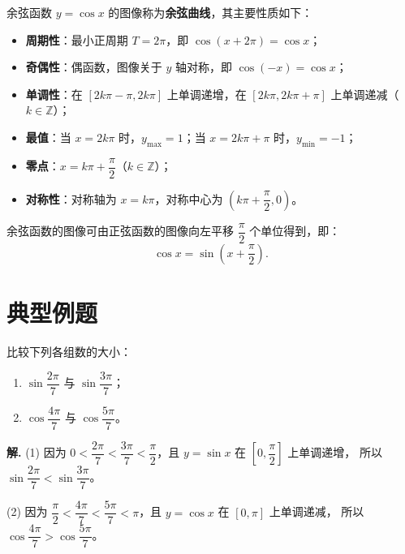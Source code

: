 \documentclass[11pt]{ctexrep}
\begin{document}
\begin{property}[余弦函数的图像与性质]
    余弦函数 $y = \cos x$ 的图像称为\textbf{余弦曲线}，其主要性质如下：
    \begin{itemize}
        \item \textbf{周期性}：最小正周期 $T = 2\pi$，即 $\cos(x + 2\pi) = \cos x$；
        \item \textbf{奇偶性}：偶函数，图像关于 $y$ 轴对称，即 $\cos(-x) = \cos x$；
        \item \textbf{单调性}：在 $[2k\pi - \pi, 2k\pi]$ 上单调递增，在 $[2k\pi, 2k\pi + \pi]$ 上单调递减（$k \in \mathbb{Z}$）；
        \item \textbf{最值}：当 $x = 2k\pi$ 时，$y_{\max} = 1$；当 $x = 2k\pi + \pi$ 时，$y_{\min} = -1$；
        \item \textbf{零点}：$x = k\pi + \dfrac{\pi}{2}$（$k \in \mathbb{Z}$）；
        \item \textbf{对称性}：对称轴为 $x = k\pi$，对称中心为 $\left(k\pi + \dfrac{\pi}{2}, 0\right)$。
    \end{itemize}
\end{property}

\begin{property}[正弦曲线与余弦曲线的关系]
    余弦函数的图像可由正弦函数的图像向左平移 $\dfrac{\pi}{2}$ 个单位得到，即：
    \[
        \cos x = \sin\left(x + \frac{\pi}{2}\right).
    \]
\end{property}

\section*{典型例题}

\begin{example}[利用单调性比较大小]
    比较下列各组数的大小：
    \begin{enumerate}
        \item $\sin\dfrac{2\pi}{7}$ 与 $\sin\dfrac{3\pi}{7}$；
        \item $\cos\dfrac{4\pi}{7}$ 与 $\cos\dfrac{5\pi}{7}$。
    \end{enumerate}
\end{example}

\textbf{解.} (1) 因为 $0 < \dfrac{2\pi}{7} < \dfrac{3\pi}{7} < \dfrac{\pi}{2}$，且 $y = \sin x$ 在 $\left[0, \dfrac{\pi}{2}\right]$ 上单调递增，
所以 $\sin\dfrac{2\pi}{7} < \sin\dfrac{3\pi}{7}$。

(2) 因为 $\dfrac{\pi}{2} < \dfrac{4\pi}{7} < \dfrac{5\pi}{7} < \pi$，且 $y = \cos x$ 在 $[0, \pi]$ 上单调递减，
所以 $\cos\dfrac{4\pi}{7} > \cos\dfrac{5\pi}{7}$。
\end{document}
